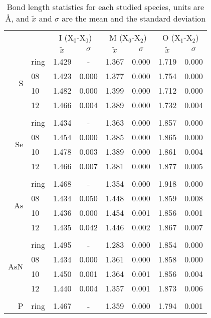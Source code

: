 \begin{table}
    \centering
    \caption[Bond length study]{Bond length statistics for each studied species, units are \si{\angstrom}, and $\tilde{x}$ and $\sigma$ are the mean and the standard deviation}
    \begin{tabular}{@{}rlcccccc@{}}
        \toprule
        && \multicolumn{2}{c}{I (X$_0$-X$_0$)} & \multicolumn{2}{c}{M (X$_0$-X$_2$)} & \multicolumn{2}{c}{O (X$_1$-X$_2$)} \\
        && $\tilde{x}$ & $\sigma$ & $\tilde{x}$ & $\sigma$ & $\tilde{x}$ & $\sigma$ \\
        \midrule
        \multirow{4}{*}{S} & ring & 1.429 & - & 1.367 & 0.000 & 1.719 & 0.000 \\
        & 08 & 1.423 & 0.000 & 1.377 & 0.000 & 1.754 & 0.000 \\
        & 10 & 1.482 & 0.000 & 1.399 & 0.000 & 1.712 & 0.000 \\
        & 12 & 1.466 & 0.004 & 1.389 & 0.000 & 1.732 & 0.004 \\
        \\
        \multirow{4}{*}{Se} & ring & 1.434 & - & 1.363 & 0.000 & 1.857 & 0.000 \\
        & 08 & 1.454 & 0.000 & 1.385 & 0.000 & 1.865 & 0.000 \\
        & 10 & 1.478 & 0.003 & 1.389 & 0.000 & 1.861 & 0.004 \\
        & 12 & 1.466 & 0.007 & 1.381 & 0.000 & 1.877 & 0.005 \\
        \\
        \multirow{4}{*}{As} & ring & 1.468 & - & 1.354 & 0.000 & 1.918 & 0.000 \\
        & 08 & 1.434 & 0.050 & 1.448 & 0.000 & 1.859 & 0.008 \\
        & 10 & 1.436 & 0.000 & 1.454 & 0.001 & 1.856 & 0.001 \\
        & 12 & 1.435 & 0.042 & 1.446 & 0.002 & 1.867 & 0.007 \\
        \\
        \multirow{4}{*}{AsN} & ring & 1.495 & - & 1.283 & 0.000 & 1.854 & 0.000 \\
        & 08 & 1.434 & 0.000 & 1.361 & 0.000 & 1.858 & 0.000 \\
        & 10 & 1.450 & 0.001 & 1.364 & 0.001 & 1.856 & 0.004 \\
        & 12 & 1.440 & 0.004 & 1.357 & 0.001 & 1.873 & 0.006 \\
        \\
        \multirow{4}{*}{P} & ring & 1.467 & - & 1.359 & 0.000 & 1.794 & 0.001 \\

\end{tabular}
\end{table}
